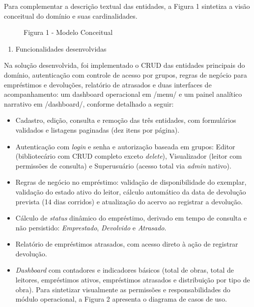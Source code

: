 \documentclass[
]{article}
\begin{document}
Para complementar a descrição textual das entidades, a Figura 1
sintetiza a visão conceitual do domínio e suas cardinalidades.

\begin{figure}
\centering

\caption{Figura 1 - Modelo Conceitual}
\end{figure}

\begin{enumerate}
\def\labelenumi{\arabic{enumi}.}
\item
  \protect{}\label{_Toc230227818}{}Funcionalidades
  desenvolvidas
\end{enumerate}

Na solução desenvolvida, foi implementado o CRUD das entidades
principais do domínio, autenticação com controle de acesso por grupos,
regras de negócio para empréstimos e devoluções, relatório de atrasados
e duas interfaces de acompanhamento: um dashboard operacional em /menu/
e um painel analítico narrativo em /dashboard/, conforme detalhado a
seguir:

\begin{itemize}
\item
  Cadastro, edição, consulta e remoção das três entidades, com
  formulários validados e listagens paginadas (dez itens por página).
\item
  Autenticação com \emph{login} e senha e autorização baseada em grupos:
  Editor (bibliotecário com CRUD completo exceto \emph{delete}),
  Visualizador (leitor com permissões de consulta) e Superusuário
  (acesso total via \emph{admin} nativo).
\item
  Regras de negócio no empréstimo: validação de disponibilidade do
  exemplar, validação do estado ativo do leitor, cálculo automático da
  data de devolução prevista (14 dias corridos) e atualização do acervo
  ao registrar a devolução.
\item
  Cálculo de \emph{status} dinâmico do empréstimo, derivado em tempo de
  consulta e não persistido: \emph{Emprestado}, \emph{Devolvido} e
  \emph{Atrasado}.
\item
  Relatório de empréstimos atrasados, com acesso direto à ação de
  registrar devolução.
\item
  \emph{Dashboard} com contadores e indicadores básicos (total de obras,
  total de leitores, empréstimos ativos, empréstimos atrasados e
  distribuição por tipo de obra). Para sintetizar visualmente as
  permissões e responsabilidades do módulo operacional, a Figura 2
  apresenta o diagrama de casos de uso.
\end{itemize}
\end{document}
